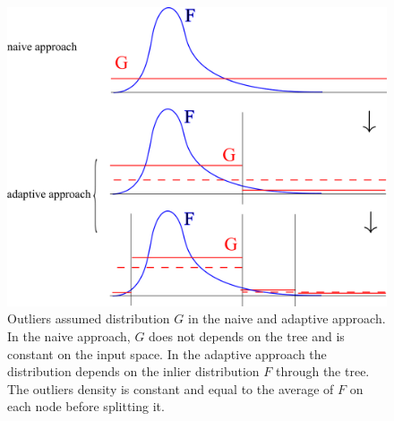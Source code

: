 \begin{figure}[!ht]
  \centering
  \includegraphics[width=0.8\linewidth]{fig_source/ocrf_fig/outlier_density.png}
  \caption{Outliers assumed distribution $G$ in the naive and adaptive approach.  In the naive approach, $G$ does not depends on the tree and is constant on the input space. In the adaptive approach the distribution depends on the inlier distribution $F$ through the tree. The outliers density is constant and equal to the average of $F$ on each node before splitting it.
}
  \label{ocrf:fig:outlier_density}
\end{figure}

\newcommand{\pointSampled}[1]{
    \coordinate (A) at (#1);
    \draw[fill=black] (A) circle (0.03cm);
}


